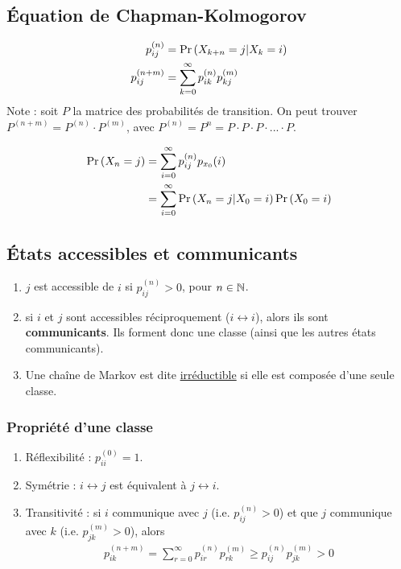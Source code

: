 \documentclass[10pt, french]{article}
\begin{document}
\begin{multicols*}{2}
\subsection*{Équation de Chapman-Kolmogorov}
\begin{align*}
p_{ij}^{(n)} 	& = \Pr \left( X_{k+n} = j | X_k = i \right) \\
p_{ij}^{(n+m)} 	& = \sum_{k=0}^{\infty} p_{ik}^{(n)} p_{kj}^{(m)} \\
\end{align*}
Note : soit $P$ la matrice des probabilités de transition. On peut trouver $P^{(n+m)} = P^{(n)} \cdot P^{(m)}$, avec $P^{(n)} = P^n = P\cdot P \cdot P \cdot ... \cdot P$.

\begin{align*}
\Pr \left( X_n = j \right) & = \sum_{i=0}^{\infty} p_{ij}^{(n)} p_{x_0}(i) \\
	& = \sum_{i=0}^{\infty} \Pr \left( X_n = j | X_0 = i \right) \Pr \left( X_0 = i \right) \\
\end{align*}

\subsection*{États accessibles et communicants}
\begin{enumerate}[label=\faAngleRight]
\item $j$ est accessible de $i$ si $p_{ij}^{(n)} >0$, pour $n \in \mathbb{N}$.

\item si $i$ et $j$ sont accessibles réciproquement ($i \leftrightarrow i$), alors ils sont \textbf{communicants}. Ils forment donc une classe (ainsi que les autres états communicants).

\item Une chaîne de Markov est dite \underline{irréductible} si elle est composée d'une seule classe.
\end{enumerate}

\subsubsection*{Propriété d'une classe}
\begin{enumerate}[label=\faCheck]
\item Réflexibilité : $p_{ii}^{(0)} = 1$.
\item Symétrie : $i \leftrightarrow j$ est équivalent à $j \leftrightarrow i$.
\item Transitivité : si $i$ communique avec $j$ (i.e. $p_{ij}^{(n)} >0$) et que $j$ communique avec $k$ (i.e. $p_{jk}^{(m)}>0$), alors
\begin{align*}
p_{ik}^{(n+m)} = \sum_{r=0}^{\infty} p_{ir}^{(n)} p_{rk}^{(m)} \geq p_{ij}^{(n)} p_{jk}^{(m)} > 0
\end{align*}
\end{enumerate}


\end{multicols*}
\end{document}

